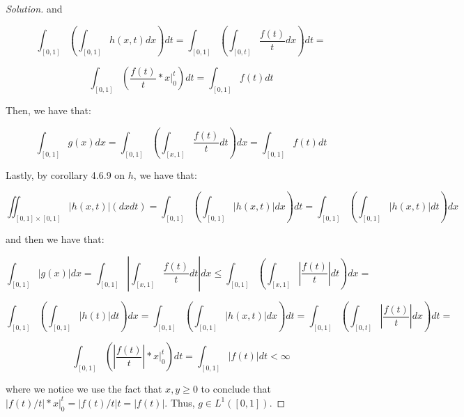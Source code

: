 \documentclass[10pt]{article}
\begin{document}
\begin{proof}[Solution]
and

$$  \int_{[0,1]} \left( \int_{[0,1]} h(x,t) dx \right)dt = \int_{[0,1]} \left( \int_{[0,t]}  \frac{f(t)}{t}  dx \right)dt = $$

$$ \int_{[0,1]} \left( \frac{f(t)}{t} \ast x \Big|_0^t \right)dt = \int_{[0,1]} f(t) dt$$

Then, we have that:

$$\int_{[0,1]} g(x) dx = \int_{[0,1]} \left( \int_{[x,1]} \frac{f(t)}{t} dt \right) dx =  \int_{[0,1]} f(t) dt$$

Lastly, by corollary 4.6.9 on $h$, we have that:

$$\iint_{[0,1]\times [0,1]} |h(x,t)| (dxdt) = \int_{[0,1]} \left( \int_{[0,1]} |h(x,t)| dx \right)dt =\int_{[0,1]} \left( \int_{[0,1]} |h(x,t)| dt \right)dx $$

and then we have that:

$$\int_{[0,1]} |g(x)| dx = \int_{[0,1]} \left| \int_{[x,1]} \frac{f(t)}{t} dt \right| dx \leq  \int_{[0,1]} \left( \int_{[x,1]} \left|\frac{f(t)}{t}\right| dt\right) dx = $$

$$ \int_{[0,1]} \left( \int_{[0,1]} \left|h(t) \right| dt\right) dx =  \int_{[0,1]} \left( \int_{[0,1]} |h(x,t)| dx \right)dt = \int_{[0,1]} \left( \int_{[0,t]} \left| \frac{f(t)}{t} \right|  dx \right)dt =$$

$$  \int_{[0,1]} \left( \left| \frac{f(t)}{t}\right| \ast x \Big|_0^t \right)dt = \int_{[0,1]} \left|f(t) \right| dt < \infty $$

where we notice we use the fact that $x,y \geq 0$ to conclude that $\left| f(t)/t\right| \ast x \Big|_0^t = \left| f(t)/t \right| t = \left| f(t) \right| $. Thus, $g \in L^1([0,1])$.

\end{proof}

 
\end{document}
